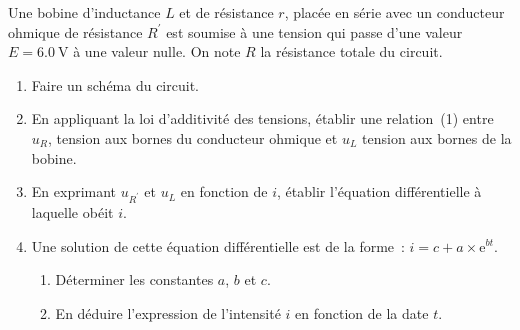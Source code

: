 Une bobine d'inductance $L$ et de résistance $r$, placée en série avec un
conducteur ohmique de résistance $R^{\prime}$ est soumise à une tension qui
passe d'une valeur $E=\qty{6.0}{\V}$ à une valeur nulle. On note $R$ la
résistance totale du circuit.

\begin{enumerate}
    \item Faire un schéma du circuit.
    \item En appliquant la loi d'additivité des tensions, établir une
          relation~(1) entre $u_{R}$, tension aux bornes du conducteur ohmique
          et $u_{L}$ tension aux bornes de la bobine.
    \item En exprimant $u_{R^{\prime}}$ et $u_{L}$ en fonction de $i$, établir
          l'équation différentielle à laquelle obéit $i$.
    \item Une solution de cette équation différentielle est de la forme~:
          $i=c+a\times\mathrm{e}^{bt}$.
          \begin{enumerate}
              \item Déterminer les constantes $a$, $b$ et $c$.
              \item En déduire l'expression de l'intensité $i$ en fonction de la
                    date $t$.
          \end{enumerate}
\end{enumerate}


